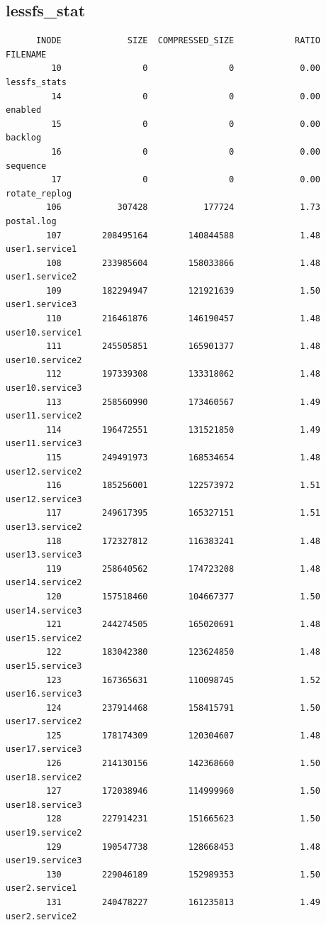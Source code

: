\documentclass[a4paper]{report}
\begin{document}
\subsection{lessfs\_stat}
  \begin{lstlisting}
	  INODE             SIZE  COMPRESSED_SIZE            RATIO  FILENAME
	     10                0                0             0.00  lessfs_stats
	     14                0                0             0.00  enabled
	     15                0                0             0.00  backlog
	     16                0                0             0.00  sequence
	     17                0                0             0.00  rotate_replog
	    106           307428           177724             1.73  postal.log
	    107        208495164        140844588             1.48  user1.service1
	    108        233985604        158033866             1.48  user1.service2
	    109        182294947        121921639             1.50  user1.service3
	    110        216461876        146190457             1.48  user10.service1
	    111        245505851        165901377             1.48  user10.service2
	    112        197339308        133318062             1.48  user10.service3
	    113        258560990        173460567             1.49  user11.service2
	    114        196472551        131521850             1.49  user11.service3
	    115        249491973        168534654             1.48  user12.service2
	    116        185256001        122573972             1.51  user12.service3
	    117        249617395        165327151             1.51  user13.service2
	    118        172327812        116383241             1.48  user13.service3
	    119        258640562        174723208             1.48  user14.service2
	    120        157518460        104667377             1.50  user14.service3
	    121        244274505        165020691             1.48  user15.service2
	    122        183042380        123624850             1.48  user15.service3
	    123        167365631        110098745             1.52  user16.service3
	    124        237914468        158415791             1.50  user17.service2
	    125        178174309        120304607             1.48  user17.service3
	    126        214130156        142368660             1.50  user18.service2
	    127        172038946        114999960             1.50  user18.service3
	    128        227914231        151665623             1.50  user19.service2
	    129        190547738        128668453             1.48  user19.service3
	    130        229046189        152989353             1.50  user2.service1
	    131        240478227        161235813             1.49  user2.service2

\end{lstlisting}
\end{document}
